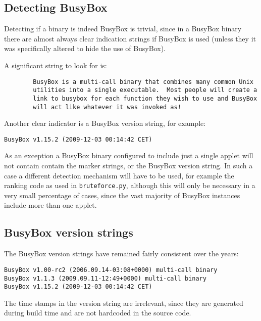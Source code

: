 \documentclass[10pt]{article}
\begin{document}
\subsection{Detecting BusyBox}

Detecting if a binary is indeed BusyBox is trivial, since in a BusyBox binary
there are almost always clear indication strings if BusyBox is used (unless
they it was specifically altered to hide the use of BusyBox).

A significant string to look for is:

\begin{verbatim}
        BusyBox is a multi-call binary that combines many common Unix
        utilities into a single executable.  Most people will create a
        link to busybox for each function they wish to use and BusyBox
        will act like whatever it was invoked as!
\end{verbatim}

Another clear indicator is a BusyBox version string, for example:

\begin{verbatim}
BusyBox v1.15.2 (2009-12-03 00:14:42 CET)
\end{verbatim}

As an exception a BusyBox binary configured to include just a single applet
will not contain contain the marker strings, or the BusyBox version string. In
such a case a different detection mechanism will have to be used, for example
the ranking code as used in \texttt{bruteforce.py}, although this will only be
necessary in a very small percentage of cases, since the vast majority of
BusyBox instances include more than one applet.

\subsection{BusyBox version strings}

The BusyBox version strings have remained fairly consistent over the years:

\begin{verbatim}
BusyBox v1.00-rc2 (2006.09.14-03:08+0000) multi-call binary
BusyBox v1.1.3 (2009.09.11-12:49+0000) multi-call binary
BusyBox v1.15.2 (2009-12-03 00:14:42 CET)
\end{verbatim}

The time stamps in the version string are irrelevant, since they are generated
during build time and are not hardcoded in the source code.
\end{document}
